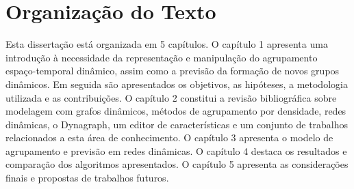 \section{Organização do Texto}
Esta dissertação está organizada em 5 capítulos. O capítulo 1 apresenta uma
introdução à necessidade da representação e manipulação do agrupamento espaço-temporal
dinâmico, assim como a previsão da formação de novos grupos dinâmicos. Em seguida são apresentados os objetivos,
as hipóteses, a metodologia utilizada e as contribuições. O capítulo 2 constitui a revisão
bibliográfica sobre modelagem com grafos dinâmicos, métodos de agrupamento por densidade, redes dinâmicas,
o Dynagraph, um editor de características e um conjunto de trabalhos relacionados a esta área de conhecimento.
O capítulo 3 apresenta o modelo de agrupamento e previsão em redes dinâmicas. O capítulo 4 destaca
os resultados e comparação dos algoritmos apresentados. O capítulo 5 apresenta as considerações finais
e propostas de trabalhos futuros.








